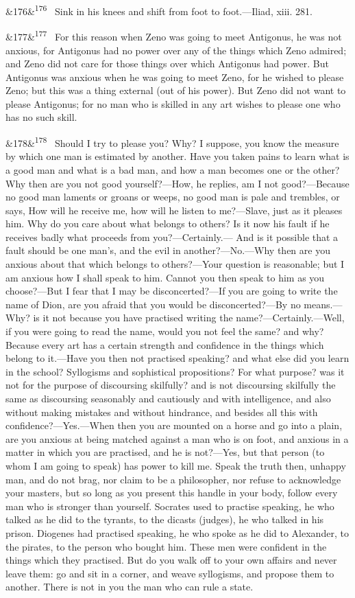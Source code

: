 \documentclass[12pt]{article}
\newcommand{\para}[1][]{\par\noindent\ifx&#1&\else\textsuperscript{\footnotesize #1}~\fi}
\begin{document}
\para[176] Sink in his knees and shift from foot to foot.—Iliad, xiii. 281.

\para[177] For this reason when Zeno was going to meet Antigonus, he was not anxious, for Antigonus had no power over any of the things which Zeno admired; and Zeno did not care for those things over which Antigonus had power. But Antigonus was anxious when he was going to meet Zeno, for he wished to please Zeno; but this was a thing external (out of his power). But Zeno did not want to please Antigonus; for no man who is skilled in any art wishes to please one who has no such skill.

\para[178] Should I try to please you? Why? I suppose, you know the measure by which one man is estimated by another. Have you taken pains to learn what is a good man and what is a bad man, and how a man becomes one or the other? Why then are you not good yourself?—How, he replies, am I not good?—Because no good man laments or groans or weeps, no good man is pale and trembles, or says, How will he receive me, how will he listen to me?—Slave, just as it pleases him. Why do you care about what belongs to others? Is it now his fault if he receives badly what proceeds from you?—Certainly.— And is it possible that a fault should be one man's, and the evil in another?—No.—Why then are you anxious about that which belongs to others?—Your question is reasonable; but I am anxious how I shall speak to him. Cannot you then speak to him as you choose?—But I fear that I may be disconcerted?—If you are going to write the name of Dion, are you afraid that you would be disconcerted?—By no means.—Why? is it not because you have practised writing the name?—Certainly.—Well, if you were going to read the name, would you not feel the same? and why? Because every art has a certain strength and confidence in the things which belong to it.—Have you then not practised speaking? and what else did you learn in the school? Syllogisms and sophistical propositions? For what purpose? was it not for the purpose of discoursing skilfully? and is not discoursing skilfully the same as discoursing seasonably and cautiously and with intelligence, and also without making mistakes and without hindrance, and besides all this with confidence?—Yes.—When then you are mounted on a horse and go into a plain, are you anxious at being matched against a man who is on foot, and anxious in a matter in which you are practised, and he is not?—Yes, but that person (to whom I am going to speak) has power to kill me. Speak the truth then, unhappy man, and do not brag, nor claim to be a philosopher, nor refuse to acknowledge your masters, but so long as you present this handle in your body, follow every man who is stronger than yourself. Socrates used to practise speaking, he who talked as he did to the tyrants, to the dicasts (judges), he who talked in his prison. Diogenes had practised speaking, he who spoke as he did to Alexander, to the pirates, to the person who bought him. These men were confident in the things which they practised. But do you walk off to your own affairs and never leave them: go and sit in a corner, and weave syllogisms, and propose them to another. There is not in you the man who can rule a state.
\end{document}
